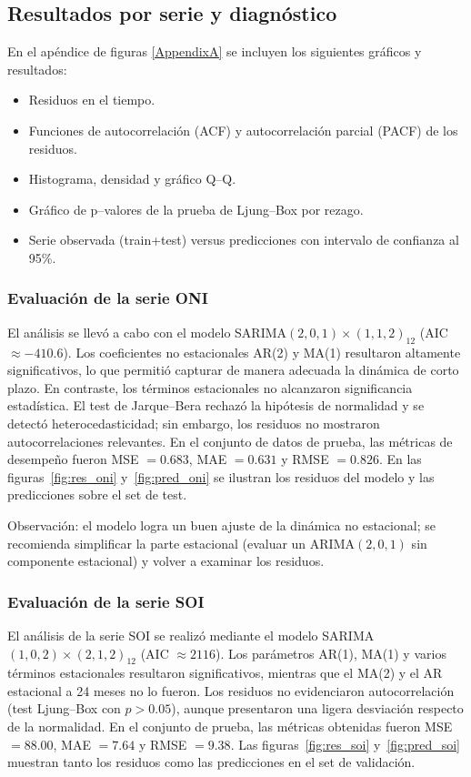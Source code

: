 \subsection{Resultados por serie y diagnóstico}
En el apéndice de figuras \ref{AppendixA} se incluyen los siguientes gráficos y resultados:

\begin{itemize}
    \item Residuos en el tiempo.  
    \item Funciones de autocorrelación (ACF) y autocorrelación parcial (PACF) de los residuos.  
    \item Histograma, densidad y gráfico Q--Q.  
    \item Gráfico de p--valores de la prueba de Ljung--Box por rezago.  
    \item Serie observada (train+test) versus predicciones con intervalo de confianza al 95\%.  
\end{itemize}

\subsubsection{Evaluación de la serie ONI} 
El análisis se llevó a cabo con el modelo SARIMA$(2,0,1)\times(1,1,2)_{12}$ (AIC $\approx -410.6$). 
Los coeficientes no estacionales AR(2) y MA(1) resultaron altamente significativos, lo que permitió capturar de manera adecuada la dinámica de corto plazo. En contraste, los términos estacionales no alcanzaron significancia estadística. El test de Jarque--Bera rechazó la hipótesis de normalidad y se detectó heterocedasticidad; sin embargo, los residuos no mostraron autocorrelaciones relevantes.  
En el conjunto de datos de prueba, las métricas de desempeño fueron MSE $=0.683$, MAE $=0.631$ y RMSE $=0.826$. En las figuras~\ref{fig:res_oni} y~\ref{fig:pred_oni} se ilustran los residuos del modelo y las predicciones sobre el set de test.  

Observación: el modelo logra un buen ajuste de la dinámica no estacional; se recomienda simplificar la parte estacional (evaluar un ARIMA$(2,0,1)$ sin componente estacional) y volver a examinar los residuos.  
\vspace{0.3em}


\subsubsection{Evaluación de la serie SOI}
El análisis de la serie SOI se realizó mediante el modelo SARIMA$(1,0,2)\times(2,1,2)_{12}$ (AIC $\approx 2116$). 
Los parámetros AR(1), MA(1) y varios términos estacionales resultaron significativos, mientras que el MA(2) y el AR estacional a 24 meses no lo fueron. Los residuos no evidenciaron autocorrelación (test Ljung--Box con $p>0.05$), aunque presentaron una ligera desviación respecto de la normalidad.  
En el conjunto de prueba, las métricas obtenidas fueron MSE $=88.00$, MAE $=7.64$ y RMSE $=9.38$. Las figuras~\ref{fig:res_soi} y~\ref{fig:pred_soi} muestran tanto los residuos como las predicciones en el set de validación.  

